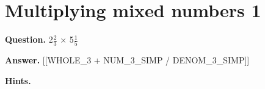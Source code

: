 \documentclass{article}
\begin{document}
\section*{Multiplying mixed numbers 1}
\textbf{Question.} 2$\frac{2}{3}$ $\times$
                    5$\frac{1}{5}$

\textbf{Answer.} [[WHOLE\_3 + NUM\_3\_SIMP / DENOM\_3\_SIMP]]

\textbf{Hints.}
\begin{itemize}

\end{itemize}
\end{document}
